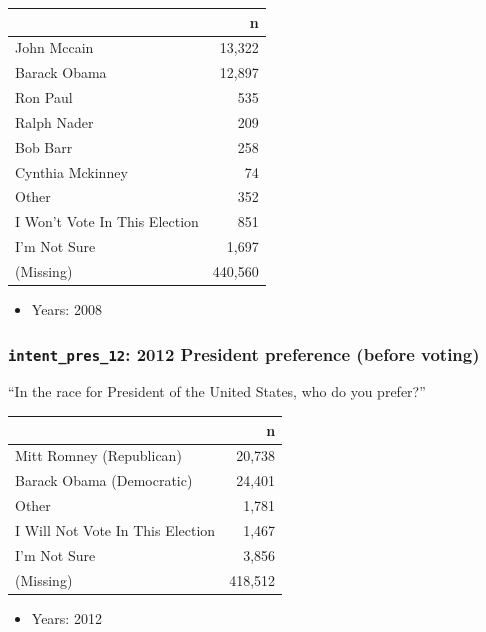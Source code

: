 \documentclass[10pt,article,oneside]{memoir}
\theoremstyle{definition}
\begin{document}
\begin{table}[H]
\centering
\begin{tabular}{lr}
\toprule
 & n\\
\midrule
John Mccain & 13,322\\
Barack Obama & 12,897\\
Ron Paul & 535\\
Ralph Nader & 209\\
Bob Barr & 258\\
Cynthia Mckinney & 74\\
Other & 352\\
I Won't Vote In This Election & 851\\
I'm Not Sure & 1,697\\
(Missing) & 440,560\\
\bottomrule
\end{tabular}
\end{table}

\begin{itemize}
\tightlist
\item
  Years: 2008
\end{itemize}

\hypertarget{intent_pres_12-2012-president-preference-before-voting}{%
\subsubsection{\texorpdfstring{\texttt{intent\_pres\_12}: 2012 President
preference (before
voting)}{intent\_pres\_12: 2012 President preference (before voting)}}\label{intent_pres_12-2012-president-preference-before-voting}}

``In the race for President of the United States, who do you prefer?''

\begin{table}[H]
\centering
\begin{tabular}{lr}
\toprule
 & n\\
\midrule
Mitt Romney (Republican) & 20,738\\
Barack Obama (Democratic) & 24,401\\
Other & 1,781\\
I Will Not Vote In This Election & 1,467\\
I'm Not Sure & 3,856\\
(Missing) & 418,512\\
\bottomrule
\end{tabular}
\end{table}

\begin{itemize}
\tightlist
\item
  Years: 2012
\end{itemize}
\end{document}
